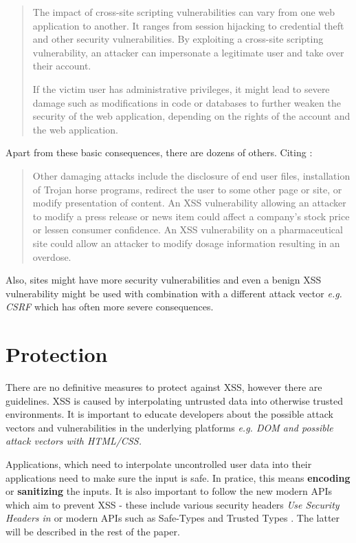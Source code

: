 \begin{quotation}
  The impact of cross-site scripting vulnerabilities can vary from one web application to another.
  It ranges from session hijacking to credential theft and other security vulnerabilities. By
  exploiting a cross-site scripting vulnerability, an attacker can impersonate a legitimate user and
  take over their account.

  If the victim user has administrative privileges, it might lead to severe damage such as
  modifications in code or databases to further weaken the security of the web application,
  depending on the rights of the account and the web application.
\end{quotation}

Apart from these basic consequences, there are dozens of others. Citing \cite{xss_owasp_intro}:

\begin{quotation}
  Other damaging attacks include the disclosure of end user files, installation of Trojan horse
  programs, redirect the user to some other page or site, or modify presentation of content. An XSS
  vulnerability allowing an attacker to modify a press release or news item could affect a company’s
  stock price or lessen consumer confidence. An XSS vulnerability on a pharmaceutical site could
  allow an attacker to modify dosage information resulting in an overdose.
\end{quotation}

Also, sites might have more security vulnerabilities and even a benign XSS vulnerability might be
used with combination with a different attack vector \emph{e.g. CSRF} which has often more severe
consequences.

\section{Protection}

There are no definitive measures to protect against XSS, however there are guidelines. XSS is caused
by interpolating untrusted data into otherwise trusted environments. It is important to educate
developers about the possible attack vectors and vulnerabilities in the underlying platforms
\emph{e.g. DOM and possible attack vectors with HTML/CSS.}

Applications, which need to interpolate uncontrolled user data into their applications need to make
sure the input is safe. In pratice, this means \textbf{encoding} or \textbf{sanitizing} the inputs.
It is also important to follow the new modern APIs which aim to prevent XSS - these include various
security headers \emph{Use Security Headers in \cite{cypress_xss_consequences}} or modern APIs such
as Safe-Types \cite{safe_types} and Trusted Types \cite{trusted_types_into}. The latter will be
described in the rest of the paper.
